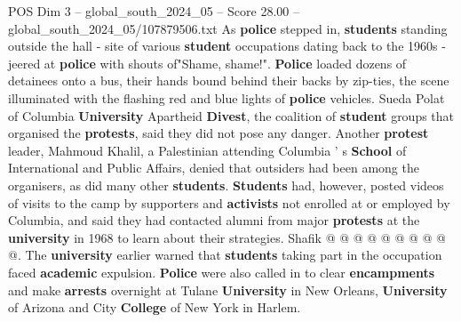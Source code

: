 \begin{textsample}{POS Dim 3 – global\_south\_2024\_05 – Score 28.00 – global\_south\_2024\_05/107879506.txt}
As \textbf{police} stepped in, \textbf{students} standing outside the hall - site of various \textbf{student} occupations dating back to the 1960s - jeered at \textbf{police} with shouts of"Shame, shame!". \textbf{Police} loaded dozens of detainees onto a bus, their hands bound behind their backs by zip-ties, the scene illuminated with the flashing red and blue lights of \textbf{police} vehicles.
Sueda Polat of Columbia \textbf{University} Apartheid \textbf{Divest}, the coalition of \textbf{student} groups that organised the \textbf{protests}, said they did not pose any danger.
Another \textbf{protest} leader, Mahmoud Khalil, a Palestinian attending Columbia ' s \textbf{School} of International and Public Affairs, denied that outsiders had been among the organisers, as did many other \textbf{students}. \textbf{Students} had, however, posted videos of visits to the camp by supporters and \textbf{activists} not enrolled at or employed by Columbia, and said they had contacted alumni from major \textbf{protests} at the \textbf{university} in 1968 to learn about their strategies.
Shafik @ @ @ @ @ @ @ @ @ @.
The \textbf{university} earlier warned that \textbf{students} taking part in the occupation faced \textbf{academic} expulsion. \textbf{Police} were also called in to clear \textbf{encampments} and make \textbf{arrests} overnight at Tulane \textbf{University} in New Orleans, \textbf{University} of Arizona and City \textbf{College} of New York in Harlem.

\end{textsample}
